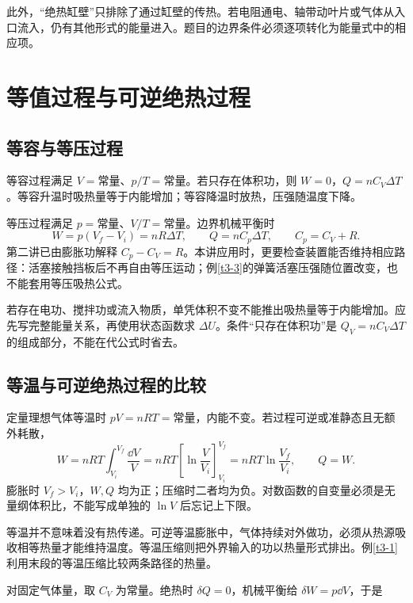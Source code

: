 此外，“绝热缸壁”只排除了通过缸壁的传热。若电阻通电、轴带动叶片或气体从入口流入，仍有其他形式的能量进入。题目的边界条件必须逐项转化为能量式中的相应项。

\section{等值过程与可逆绝热过程}
\subsection{等容与等压过程}
等容过程满足 $V=\text{常量}$、$p/T=\text{常量}$。若只存在体积功，则 $W=0$，$Q=nC_V\Delta T$。等容升温时吸热量等于内能增加；等容降温时放热，压强随温度下降。

等压过程满足 $p=\text{常量}$、$V/T=\text{常量}$。边界机械平衡时
\[W=p(V_f-V_i)=nR\Delta T,\qquad Q=nC_p\Delta T,\qquad C_p=C_V+R.
\]
第二讲已由膨胀功解释 $C_p-C_V=R$。本讲应用时，更要检查装置能否维持相应路径：活塞接触挡板后不再自由等压运动；例\ref{t3-3}的弹簧活塞压强随位置改变，也不能套用等压吸热公式。


若存在电功、搅拌功或流入物质，单凭体积不变不能推出吸热量等于内能增加。应先写完整能量关系，再使用状态函数求 $\Delta U$。条件“只存在体积功”是 $Q_V=nC_V\Delta T$ 的组成部分，不能在代公式时省去。

\subsection{等温与可逆绝热过程的比较}
定量理想气体等温时 $pV=nRT=\text{常量}$，内能不变。若过程可逆或准静态且无额外耗散，
\[W=nRT\int_{V_i}^{V_f}\frac{\dd V}{V}
=nRT\left[\ln\frac V{V_i}\right]_{V_i}^{V_f}
=nRT\ln\frac{V_f}{V_i},\qquad Q=W.
\]
膨胀时 $V_f>V_i$，$W,Q$ 均为正；压缩时二者均为负。对数函数的自变量必须是无量纲体积比，不能写成单独的 $\ln V$ 后忘记上下限。

等温并不意味着没有热传递。可逆等温膨胀中，气体持续对外做功，必须从热源吸收相等热量才能维持温度。等温压缩则把外界输入的功以热量形式排出。例\ref{t3-1}利用末段的等温压缩比较两条路径的热量。


对固定气体量，取 $C_V$ 为常量。绝热时 $\delta Q=0$，机械平衡给 $\delta W=p\dd V$，于是

